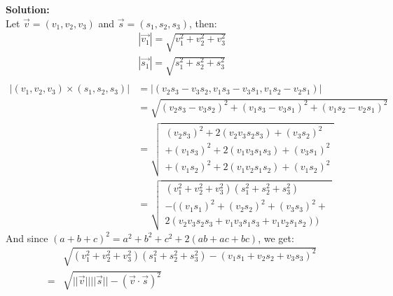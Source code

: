 \documentclass{article}
\newcommand\TheSolution{%
  \textbf{Solution:}\\%
}
\begin{document}
\TheSolution
Let $\vec{v} = (v_1, v_2, v_3)$ and $\vec{s} = (s_1, s_2, s_3)$, then:
\begin{equation}
    \begin{aligned}
        |\vec{v_1}| = \sqrt{v_1^2 + v_2^2 + v_3^2} \\
        |\vec{s_1}| = \sqrt{s_1^2 + s_2^2 + s_3^2} \\
    \end{aligned}
\end{equation}
\begin{equation}
    \begin{aligned}
        |(v_1, v_2, v_3) \times (s_1, s_2, s_3)| & = |(v_2 s_3 - v_3 s_2, v_1 s_3 - v_3 s_1, v_1 s_2 - v_2 s_1)|                     \\
                                                 & = \sqrt{ (v_2 s_3 - v_3 s_2)^2 + (v_1 s_3 - v_3 s_1) ^2 + (v_1 s_2 - v_2 s_1)^2 } \\
                                                 & = \sqrt{
            \begin{aligned}
                (v_2 s_3) ^2    + 2(v_2 v_3 s_2 s_3) + (v_3 s_2) ^2 \\
                +  (v_1 s_3) ^2 + 2(v_1 v_3 s_1 s_3) + (v_3 s_1) ^2 \\
                +  (v_1 s_2) ^2 + 2(v_1 v_2 s_1 s_2) + (v_1 s_2) ^2
            \end{aligned}
        }                                                                                                                            \\
                                                 & = \sqrt{
            \begin{aligned}
                (v_1^2 + v_2^2 + v_3^2)(s_1^2 + s_2^2 + s_3^2) \\
                - ((v_1 s_1)^2 + (v_2 s_2)^2 + (v_3 s_3)^2 +   \\
                2(v_2 v_3 s_2 s_3 + v_1 v_3 s_1 s_3 + v_1 v_2 s_1 s_2))
            \end{aligned}
        }
    \end{aligned}
\end{equation}
And since $(a + b + c)^2 = a^2 + b^2 + c^2 + 2(ab + ac + bc)$, we get:
\begin{equation}
    \begin{aligned}
          & \sqrt{(v_1^2 + v_2^2 + v_3^2)(s_1^2 + s_2^2 + s_3^2) - (v_1 s_1 + v_2 s_2 + v_3 s_3)^2} \\
        = & \sqrt{||\vec{v}||||\vec{s}|| - (\vec{v} \cdot \vec{s})^2}                               \\
    \end{aligned}
\end{equation}
\end{document}
